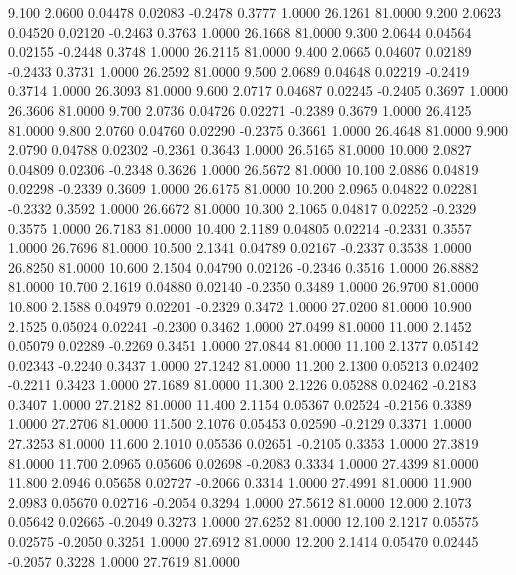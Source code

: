    9.100   2.0600   0.04478   0.02083  -0.2478   0.3777   1.0000  26.1261  81.0000
   9.200   2.0623   0.04520   0.02120  -0.2463   0.3763   1.0000  26.1668  81.0000
   9.300   2.0644   0.04564   0.02155  -0.2448   0.3748   1.0000  26.2115  81.0000
   9.400   2.0665   0.04607   0.02189  -0.2433   0.3731   1.0000  26.2592  81.0000
   9.500   2.0689   0.04648   0.02219  -0.2419   0.3714   1.0000  26.3093  81.0000
   9.600   2.0717   0.04687   0.02245  -0.2405   0.3697   1.0000  26.3606  81.0000
   9.700   2.0736   0.04726   0.02271  -0.2389   0.3679   1.0000  26.4125  81.0000
   9.800   2.0760   0.04760   0.02290  -0.2375   0.3661   1.0000  26.4648  81.0000
   9.900   2.0790   0.04788   0.02302  -0.2361   0.3643   1.0000  26.5165  81.0000
  10.000   2.0827   0.04809   0.02306  -0.2348   0.3626   1.0000  26.5672  81.0000
  10.100   2.0886   0.04819   0.02298  -0.2339   0.3609   1.0000  26.6175  81.0000
  10.200   2.0965   0.04822   0.02281  -0.2332   0.3592   1.0000  26.6672  81.0000
  10.300   2.1065   0.04817   0.02252  -0.2329   0.3575   1.0000  26.7183  81.0000
  10.400   2.1189   0.04805   0.02214  -0.2331   0.3557   1.0000  26.7696  81.0000
  10.500   2.1341   0.04789   0.02167  -0.2337   0.3538   1.0000  26.8250  81.0000
  10.600   2.1504   0.04790   0.02126  -0.2346   0.3516   1.0000  26.8882  81.0000
  10.700   2.1619   0.04880   0.02140  -0.2350   0.3489   1.0000  26.9700  81.0000
  10.800   2.1588   0.04979   0.02201  -0.2329   0.3472   1.0000  27.0200  81.0000
  10.900   2.1525   0.05024   0.02241  -0.2300   0.3462   1.0000  27.0499  81.0000
  11.000   2.1452   0.05079   0.02289  -0.2269   0.3451   1.0000  27.0844  81.0000
  11.100   2.1377   0.05142   0.02343  -0.2240   0.3437   1.0000  27.1242  81.0000
  11.200   2.1300   0.05213   0.02402  -0.2211   0.3423   1.0000  27.1689  81.0000
  11.300   2.1226   0.05288   0.02462  -0.2183   0.3407   1.0000  27.2182  81.0000
  11.400   2.1154   0.05367   0.02524  -0.2156   0.3389   1.0000  27.2706  81.0000
  11.500   2.1076   0.05453   0.02590  -0.2129   0.3371   1.0000  27.3253  81.0000
  11.600   2.1010   0.05536   0.02651  -0.2105   0.3353   1.0000  27.3819  81.0000
  11.700   2.0965   0.05606   0.02698  -0.2083   0.3334   1.0000  27.4399  81.0000
  11.800   2.0946   0.05658   0.02727  -0.2066   0.3314   1.0000  27.4991  81.0000
  11.900   2.0983   0.05670   0.02716  -0.2054   0.3294   1.0000  27.5612  81.0000
  12.000   2.1073   0.05642   0.02665  -0.2049   0.3273   1.0000  27.6252  81.0000
  12.100   2.1217   0.05575   0.02575  -0.2050   0.3251   1.0000  27.6912  81.0000
  12.200   2.1414   0.05470   0.02445  -0.2057   0.3228   1.0000  27.7619  81.0000
